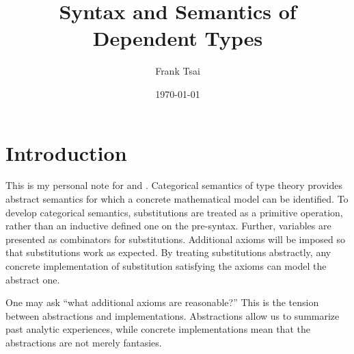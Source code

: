 \documentclass{amsart}
\title{Syntax and Semantics of Dependent Types}
\author{Frank Tsai}
\date{\today}
\begin{document}
\maketitle
\tableofcontents

\newcommand{\Ty}{\ensuremath{\mathcal{U}}}
\newcommand{\Tm}{\ensuremath{\widetilde{\mathcal{U}}}}
\newcommand{\El}{\ensuremath{\mathrm{El}}}
\newcommand{\app}{\ensuremath{\mathrm{App}}}
\newcommand{\Block}[1]{\paragraph{\fbox{\textbf{#1}}}}
\newcommand{\ctxt}{\ensuremath{~\mathsf{ctxt}}}
\newcommand{\type}{\ensuremath{~\mathsf{type}}}
\newcommand{\todo}{{\color{red}{TODO}}}

\newcommand{\Fam}{\ensuremath{\mathsf{Fam}}}
\newcommand{\Cop}{\ensuremath{\mathsf{op}}}

\section{Introduction}
\label{sec:introduction}
This is my personal note for \cite{hofmann:ssdts} and \cite{awodey:natmodels}.
Categorical semantics of type theory provides abstract semantics for which a concrete mathematical model can be identified.
To develop categorical semantics, substitutions are treated as a primitive operation, rather than an inductive defined one on the pre-syntax.
Further, variables are presented as combinators for substitutions.
Additional axioms will be imposed so that substitutions work as expected.
By treating substitutions abstractly, any concrete implementation of substitution satisfying the axioms can model the abstract one.

One may ask ``what additional axioms are reasonable?''
This is the tension between abstractions and implementations.
Abstractions allow us to summarize past analytic experiences, while concrete implementations mean that the abstractions are not merely fantasies.
\end{document}
